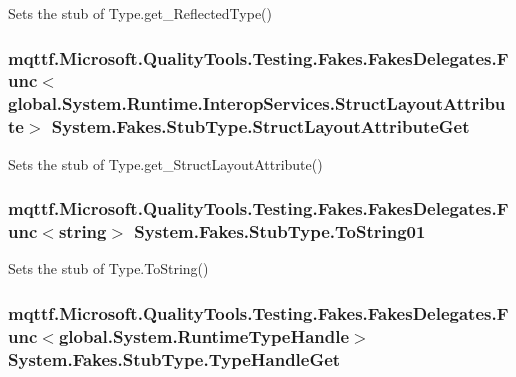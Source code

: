 Sets the stub of Type.\-get\-\_\-\-Reflected\-Type()

\hypertarget{class_system_1_1_fakes_1_1_stub_type_a4e630b7ebbb466eb8413c9239f8bca58}{
\subsubsection[{Struct\-Layout\-Attribute\-Get}]{\setlength{\rightskip}{0pt plus 5cm}mqttf.\-Microsoft.\-Quality\-Tools.\-Testing.\-Fakes.\-Fakes\-Delegates.\-Func$<$global.\-System.\-Runtime.\-Interop\-Services.\-Struct\-Layout\-Attribute$>$ System.\-Fakes.\-Stub\-Type.\-Struct\-Layout\-Attribute\-Get}}\label{class_system_1_1_fakes_1_1_stub_type_a4e630b7ebbb466eb8413c9239f8bca58}


Sets the stub of Type.\-get\-\_\-\-Struct\-Layout\-Attribute()

\hypertarget{class_system_1_1_fakes_1_1_stub_type_a7373eab5a6bc6a08705c861de8d941cb}{
\subsubsection[{To\-String01}]{\setlength{\rightskip}{0pt plus 5cm}mqttf.\-Microsoft.\-Quality\-Tools.\-Testing.\-Fakes.\-Fakes\-Delegates.\-Func$<$string$>$ System.\-Fakes.\-Stub\-Type.\-To\-String01}}\label{class_system_1_1_fakes_1_1_stub_type_a7373eab5a6bc6a08705c861de8d941cb}


Sets the stub of Type.\-To\-String()

\hypertarget{class_system_1_1_fakes_1_1_stub_type_a2e23afaee6056126fe3ac92f4ed67c0c}{
\subsubsection[{Type\-Handle\-Get}]{\setlength{\rightskip}{0pt plus 5cm}mqttf.\-Microsoft.\-Quality\-Tools.\-Testing.\-Fakes.\-Fakes\-Delegates.\-Func$<$global.\-System.\-Runtime\-Type\-Handle$>$ System.\-Fakes.\-Stub\-Type.\-Type\-Handle\-Get}}\label{class_system_1_1_fakes_1_1_stub_type_a2e23afaee6056126fe3ac92f4ed67c0c}


